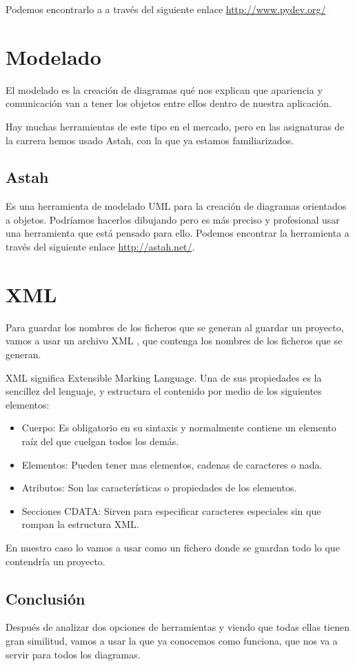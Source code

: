Podemos encontrarlo a a través del siguiente enlace \url{http://www.pydev.org/}

\section{Modelado}
El modelado es la creación de diagramas qué nos explican que apariencia y comunicación van a tener los objetos entre ellos dentro de nuestra aplicación.

Hay muchas herramientas de este tipo en el mercado, pero en las asignaturas de la carrera hemos usado Astah, con la que ya estamos familiarizados. 


\subsection{Astah}
Es una herramienta de modelado UML para la creación de diagramas orientados a objetos.
Podríamos hacerlos dibujando pero es más preciso y profesional usar una herramienta  que está pensado para ello.
Podemos encontrar la herramienta a través del siguiente enlace  
\url{http://astah.net/}.

\section{XML}
Para guardar los nombres de los ficheros que se generan al guardar un proyecto, vamos a usar un archivo XML \cite{Wiki:xml}, que contenga los nombres de los ficheros que se generan.

XML significa Extensible Marking Language. Una de sus propiedades es la sencillez del lenguaje, y estructura el contenido por medio de los siguientes elementos: 
\begin{itemize}
\item Cuerpo: Es obligatorio en su sintaxis y normalmente contiene un elemento raíz del que cuelgan todos los demás.
\item Elementos: Pueden tener mas elementos, cadenas de caracteres o nada.
\item Atributos: Son las características o propiedades de los elementos. 
\item Secciones CDATA: Sirven para especificar caracteres especiales sin que rompan la estructura XML. 
\end{itemize}
 

En nuestro caso lo vamos a usar como un fichero donde se guardan todo lo que contendría un proyecto.
\subsection{Conclusión}
Después de analizar dos opciones de herramientas y viendo que todas ellas tienen gran similitud, vamos a usar la que ya conocemos como funciona, que nos va a servir para todos los diagramas.


